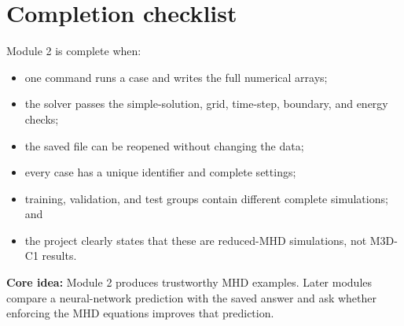 \documentclass[11pt]{article}
\begin{document}
\section{Completion checklist}

Module 2 is complete when:

\begin{itemize}[leftmargin=2em]
\item one command runs a case and writes the full numerical arrays;
\item the solver passes the simple-solution, grid, time-step, boundary, and energy checks;
\item the saved file can be reopened without changing the data;
\item every case has a unique identifier and complete settings;
\item training, validation, and test groups contain different complete simulations; and
\item the project clearly states that these are reduced-MHD simulations, not M3D-C1 results.
\end{itemize}

\begin{overviewbox}
\textbf{Core idea:} Module 2 produces trustworthy MHD examples. Later modules compare a neural-network prediction with the saved answer and ask whether enforcing the MHD equations improves that prediction.
\end{overviewbox}
\end{document}
